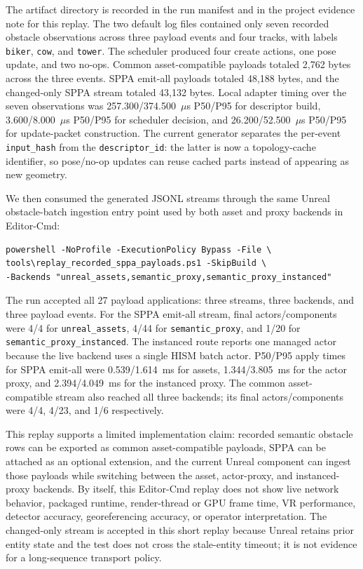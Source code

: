 ﻿\documentclass[11pt,a4paper]{article}
\begin{document}
The artifact directory is recorded in the run manifest and in the project
evidence note for this replay.
The two default log files contained only seven recorded obstacle observations
across three payload events and four tracks, with labels \texttt{biker},
\texttt{cow}, and \texttt{tower}. The scheduler produced four create actions,
one pose update, and two no-ops. Common asset-compatible payloads totaled
2,762 bytes across the three events. SPPA emit-all payloads totaled 48,188 bytes,
and the changed-only SPPA stream totaled 43,132 bytes. Local adapter timing over
the seven observations was 257.300/374.500~\(\mu\)s P50/P95 for descriptor
build, 3.600/8.000~\(\mu\)s P50/P95 for scheduler decision, and
26.200/52.500~\(\mu\)s P50/P95 for update-packet construction. The current
generator separates the per-event \texttt{input\_hash} from the
\texttt{descriptor\_id}: the latter is now a topology-cache identifier, so
pose/no-op updates can reuse cached parts instead of appearing as new geometry.

We then consumed the generated JSONL streams through the same Unreal
obstacle-batch ingestion entry point used by both asset and proxy backends in
Editor-Cmd:

\begin{verbatim}
powershell -NoProfile -ExecutionPolicy Bypass -File \
tools\replay_recorded_sppa_payloads.ps1 -SkipBuild \
-Backends "unreal_assets,semantic_proxy,semantic_proxy_instanced"
\end{verbatim}

The run accepted all 27 payload applications: three streams, three backends, and
three payload events. For the SPPA emit-all stream, final actors/components were
4/4 for \texttt{unreal\_assets}, 4/44 for \texttt{semantic\_proxy}, and 1/20
for \texttt{semantic\_proxy\_instanced}. The instanced route reports one managed
actor because the live backend uses a single HISM batch actor. P50/P95 apply
times for SPPA emit-all were 0.539/1.614~ms for assets, 1.344/3.805~ms for the
actor proxy, and 2.394/4.049~ms for the instanced proxy. The common
asset-compatible stream also reached all three backends; its final
actors/components were 4/4, 4/23, and 1/6 respectively.

This replay supports a limited implementation claim: recorded semantic obstacle
rows can be exported as common asset-compatible payloads, SPPA can be attached
as an optional extension, and the current Unreal component can ingest those
payloads while switching between the asset, actor-proxy, and instanced-proxy
backends. By itself, this Editor-Cmd replay does not show live network behavior,
packaged runtime, render-thread or GPU frame time, VR performance, detector
accuracy, georeferencing accuracy, or operator interpretation. The changed-only
stream is accepted in this short replay because Unreal retains prior entity
state and the test does not cross the stale-entity timeout; it is not evidence
for a long-sequence transport policy.
\end{document}
